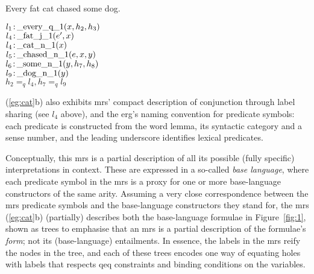 \begin{examples}
\item   \label{eg:cat}
\begin{subexamples}
\item
Every fat cat chased some dog.
\item   $l_1\colon\!\mbox{\_every\_q\_1}(x,h_2,h_3)$\\
$l_4\colon\!\mbox{\_fat\_j\_1}(e',x)$\\
$l_4\colon\!\mbox{\_cat\_n\_1}(x)$\\
$l_5\colon\!\mbox{\_chased\_n\_1}(e,x,y)$\\
$l_6\colon\!\mbox{\_some\_n\_1}(y,h_7,h_8)$\\
$l_9\colon\!\mbox{\_dog\_n\_1}(y)$\\
$h_2 =_q l_4, h_7 =_q l_9$
\end{subexamples}
\end{examples}
(\ref{eg:cat}b) also exhibits {\sc mrs}' compact description of
conjunction through label sharing (see $l_4$ above), and the {\sc
  erg}'s naming convention for predicate symbols: each predicate is
constructed from the word lemma, its syntactic category and a sense
number, and the leading underscore identifies lexical predicates.

Conceptually, this {\sc mrs} is a partial description of all its
possible (fully specific) interpretations in context.  
These are expressed in a so-called {\em base language}, where each
predicate symbol in the {\sc mrs} is a proxy for one or more
base-language constructors of the same arity.
Assuming a very close
correspondence between the {\sc mrs} predicate symbols and the
base-language constructors they 
stand for, the {\sc mrs}
(\ref{eg:cat}b) (partially) describes both the base-language formulae in
Figure~\ref{fig:1}, shown as trees to emphasise that an {\sc mrs} is a
partial description of the formulae's {\em form}; not its
(base-language) entailments. 
In essence, the labels in the {\sc mrs} reify the
nodes in the tree, and each of these trees encodes one way of equating
holes with labels that respects qeq constraints and binding conditions
on the variables.

